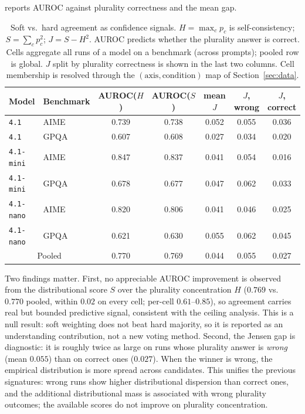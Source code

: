 \documentclass[a4paper,fleqn]{cas-sc}
\begin{document}
 reports AUROC against plurality correctness and the
mean gap. 
\begin{table}[t]\begin{minipage}{\linewidth}
\centering
\caption{Soft vs.\ hard agreement as confidence signals. $H=\max_c p_c$
is self-consistency; $S=\sum_c p_c^2$; $J=S-H^2$. AUROC predicts whether
the plurality answer is correct. Cells aggregate all runs of a model on a
benchmark (across prompts); pooled row is global. $J$ split by plurality
correctness is shown in the last two columns. Cell membership is resolved
through the $(\text{axis},\text{condition})$ map of Section~\ref{sec:data}.}
\label{tab:jensen}
\begin{tabular}{llccccc}
\toprule
Model & Benchmark & AUROC($H$) & AUROC($S$) & mean $J$ & $J$, wrong & $J$, correct \\
\midrule
\texttt{4.1} & AIME & 0.739 & 0.738 & 0.052 & 0.055 & 0.036 \\
\texttt{4.1} & GPQA & 0.607 & 0.608 & 0.027 & 0.034 & 0.020 \\
\texttt{4.1-mini} & AIME & 0.847 & 0.837 & 0.041 & 0.054 & 0.016 \\
\texttt{4.1-mini} & GPQA & 0.678 & 0.677 & 0.047 & 0.062 & 0.033 \\
\texttt{4.1-nano} & AIME & 0.820 & 0.806 & 0.041 & 0.046 & 0.025 \\
\texttt{4.1-nano} & GPQA & 0.621 & 0.630 & 0.055 & 0.062 & 0.045 \\
\midrule
\multicolumn{2}{c}{Pooled} & 0.770 & 0.769 & 0.044 & 0.055 & 0.027 \\
\bottomrule
\end{tabular}
\end{minipage}\end{table}
Two findings matter. First, no appreciable AUROC improvement is observed from the distributional score $S$ over the plurality concentration $H$
($0.769$ vs.\ $0.770$
pooled, within $0.02$ on every cell; per-cell $0.61$--$0.85$), so
agreement carries real but bounded predictive signal, consistent with
the ceiling analysis. This is a
null
result: soft weighting does not beat hard majority, so it is reported as
an understanding contribution, not
a new voting method.
Second, the Jensen gap is diagnostic: it is roughly twice as large on
runs whose plurality answer is \emph{wrong} (mean $0.055$) than on
correct ones ($0.027$). When the winner is wrong, the empirical
distribution is more spread across candidates. This unifies the previous
signatures: wrong runs show higher distributional dispersion than
correct ones, and the additional distributional mass is associated
with wrong plurality outcomes; the available scores do not improve on
plurality concentration.
\end{document}
